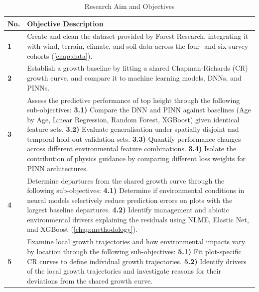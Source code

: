 \documentclass[logo,msc,ai]{infthesis}           %
\begin{document}
\vspace{-0.5em}
\begin{table}[!htbp]
\caption{Research Aim and Objectives}
\label{tab:aims_objectives}
\small %
\setlength{\tabcolsep}{4pt}
\renewcommand{\arraystretch}{1.2} %
\begin{tabular}{p{} p{}}
\hline
\textbf{No.} & \textbf{Objective Description} \\
\hline
\textbf{1} & Create and clean the dataset provided by Forest Research, integrating it with wind, terrain, climate, and soil data across the four- and six-survey cohorts (\ref{chap:data}). \\

\textbf{2} & Establish a growth baseline by fitting a shared Chapman-Richards (CR) growth curve, and compare it to machine learning models, DNNs, and PINNs. \\

\textbf{3} & Assess the predictive performance of top height through the following sub-objectives: \newline
  \textbf{3.1)} Compare the DNN and PINN against baselines (Age by Age, Linear Regression, Random Forest, XGBoost) given identical feature sets. \newline
  \textbf{3.2)} Evaluate generalisation under spatially disjoint and temporal hold-out validation sets. \newline
  \textbf{3.3)} Quantify performance changes across different environmental feature combinations. \newline
  \textbf{3.4)} Isolate the contribution of physics guidance by comparing different loss weights for PINN architectures. \\

\textbf{4} & Determine departures from the shared growth curve through the following sub-objectives: \newline
  \textbf{4.1)} Determine if environmental conditions in neural models selectively reduce prediction errors on plots with the largest baseline departures. \newline
  \textbf{4.2)} Identify management and abiotic environmental drivers explaining the residuals using NLME, Elastic Net, and XGBoost (\ref{chap:methodology}). \\

\textbf{5} & Examine local growth trajectories and how environmental impacts vary by location through the following sub-objectives: \newline
  \textbf{5.1)} Fit plot-specific CR curves to define individual growth trajectories. \newline
  \textbf{5.2)} Identify drivers of the local growth trajectories and investigate reasons for their deviations from the shared growth curve. \\
\hline
\end{tabular}
\end{table}
\vspace{-0.5em}
\end{document}
